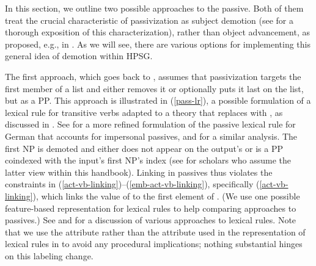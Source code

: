 \documentclass[output=paper
                ,modfonts
                ,nonflat
	        ,collection
	        ,collectionchapter
	        ,collectiontoclongg
 	        ,biblatex
                ,babelshorthands
                ,newtxmath
                ,draftmode
                ,colorlinks, citecolor=brown
]{./langsci/langscibook}
\begin{document}
In this section, we outline two possible approaches to 
the passive.  
Both of them treat the crucial characteristic of passivization as subject demotion (see \citealt{Blevins2003} for a thorough exposition of this characterization), rather than object advancement, as proposed, e.g., in  \citep{PerlmutterandPostal1983b}.
As we will see, there are various options for implementing this general idea of demotion within HPSG.

The first approach, which goes back to \citet{pollard+sag:1987}, assumes that passivization targets the first member of a  list and either removes it or optionally puts it last on the list, but as a PP.
This approach is illustrated in (\ref{pass-lr}), a possible formulation of a lexical rule for transitive verbs adapted to a theory that replaces  with \argst, as discussed in \citet[67]{Manning+Sag:1999}. 
See  for a  more refined formulation of the passive lexical rule for German that accounts for impersonal passives, and \citet{Blevins2003} for a similar analysis.
The first NP is demoted and either does not appear on the output's \argst or is a PP coindexed with the input's first NP's index (see  
for scholars who assume the latter view within this handbook).
Linking in passives thus violates the constraints in (\ref{act-vb-linking})--(\ref{emb-act-vb-linking}), specifically (\ref{act-vb-linking}), which links the value of  to the first element of \argst. (We use one possible feature-based representation for lexical rules to help comparing approaches to passives.) See \citet{Meurers2001} and  for a discussion of various approaches to lexical rules.
Note that we use the attribute  rather than the  attribute used in the representation of lexical rules in \citet[76]{Meurers2001} to avoid any procedural implications; nothing substantial hinges on this labeling change.
\end{document}
